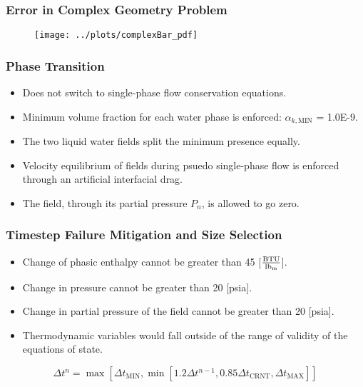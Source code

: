 \documentclass[compress,xcolor=table]{beamer}
\begin{document}
\begin{frame} 
\frametitle{Error in Complex Geometry Problem}

\begin{figure}[h!t]
\centering
\texttt{[image: ../plots/complexBar\_pdf]}
\end{figure}


\end{frame}
\begin{frame} 
\frametitle{Phase Transition}

\begin{itemize}
\item{Does not switch to single-phase flow conservation equations.}
\item{Minimum volume fraction for each water phase is enforced: $\alpha_{k,\text{MIN}}$ = 1.0E-9.}
\item{The two liquid water fields split the minimum presence equally.}
\item{Velocity equilibrium of fields during psuedo single-phase flow is enforced through an artificial interfacial drag.}
\item{The \ncg{} field, through its partial pressure $P_n$, is allowed to go zero.}
\end{itemize}

\end{frame}
\begin{frame} 
\frametitle{Timestep Failure Mitigation and Size Selection}

\begin{itemize}
\item{Change of phasic enthalpy cannot be greater than 45 [$\frac{\text{BTU}}{\lbm{}}$].}
\item{Change in pressure cannot be greater than 20 [psia].}
\item{Change in partial pressure of the \ncg{} field cannot be greater than 20 [psia].}
\item{Thermodynamic variables would fall outside of the range of validity of the equations of state.}
\end{itemize}

\begin{equation*}
\label{eqn:time_step}
\Delta t^{n} = \max\left[ \Delta t_{\text{MIN}}, \min\left[1.2 \Delta t^{n-1}, 0.85 \Delta t_{\text{CRNT}}, \Delta t_{\text{MAX}} \right]\right]
\end{equation*}

\end{frame}
\end{document}
